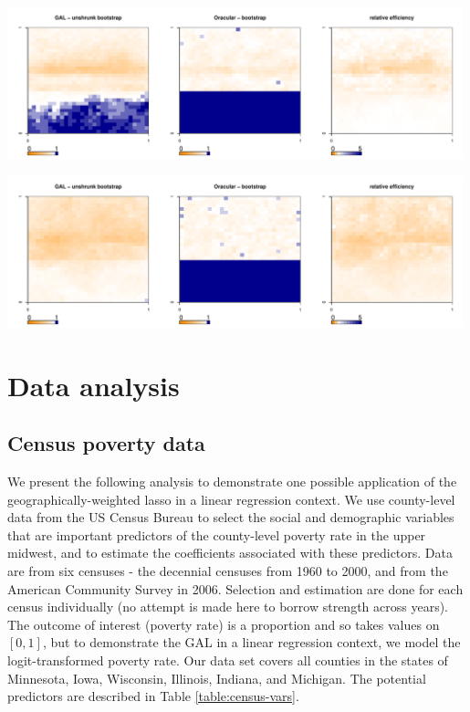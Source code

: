 \documentclass[authoryear, review, 11pt]{elsarticle}
\begin{document}
	\begin{center}
		\includegraphics[width=0.99\textwidth]{../../figures/X1-28-17.pdf}
		\label{fig:coveragemap17}
	\end{center}
	
	\begin{center}
		\includegraphics[width=0.99\textwidth]{../../figures/X1-28-18.pdf}
		\label{fig:coveragemap18}
	\end{center}
	

			
\section{Data analysis}
	\subsection{Census poverty data}
	We present the following analysis to demonstrate one possible application of the geographically-weighted lasso in a linear regression context. We use county-level data from the US Census Bureau to select the social and demographic variables that are important predictors of the county-level poverty rate in the upper midwest, and to estimate the coefficients associated with these predictors. Data are from six censuses - the decennial censuses from 1960 to 2000, and from the American Community Survey in 2006. Selection and estimation are done for each census individually (no attempt is made here to borrow strength across years). The outcome of interest (poverty rate) is a proportion and so takes values on $[0,1]$, but to demonstrate the GAL in a linear regression context, we model the logit-transformed poverty rate. Our data set covers all counties in the states of Minnesota, Iowa, Wisconsin, Illinois, Indiana, and Michigan. The potential predictors are described in Table \ref{table:census-vars}.\\
	
\end{document}
